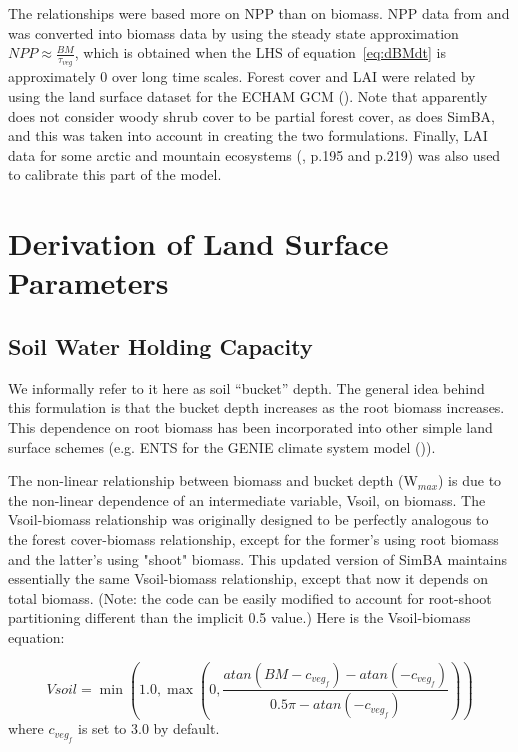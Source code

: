 The relationships were based more on NPP than on biomass.  NPP data from \cite{mcguire1992} and \cite{cramer1999} was converted into biomass data by using the steady state approximation $NPP \approx \frac{BM}{\tau_{veg}}$, which is obtained when the LHS of equation~\eqref{eq:dBMdt} is approximately 0 over long time scales.
Forest cover and LAI were related by using the land surface dataset for the ECHAM GCM (\cite{hagemann2002}).  Note that  \cite{hagemann2002} apparently does not consider woody shrub cover to be partial forest cover, as does SimBA, and this was taken into account in creating the two formulations.
Finally, LAI data for some arctic and mountain ecosystems (\cite{bliss1981}, p.195 and p.219) was also used to calibrate this part of the model.

\section{Derivation of Land Surface Parameters}

\subsection{Soil Water Holding Capacity} We informally refer to it here as soil ``bucket'' depth.  The general idea behind this formulation is that the bucket depth increases as the root biomass increases.  This dependence on root biomass has been incorporated into other simple land surface schemes (e.g. ENTS for the GENIE climate system model (\cite{williamson2006})).

The non-linear relationship between biomass and bucket depth (W$_{max}$) is due to the non-linear dependence of an intermediate variable, Vsoil, on biomass.  The Vsoil-biomass relationship was originally designed to be perfectly analogous  to the forest cover-biomass relationship, except for the former's using root biomass and the latter's using "shoot" biomass.  This updated version of SimBA maintains essentially the same Vsoil-biomass relationship, except that now it depends on total biomass.  (Note: the code can be easily modified to account for root-shoot partitioning different than the implicit 0.5 value.)  Here is the Vsoil-biomass equation:

\begin{equation}
Vsoil = \min(1.0,\max(0,\frac{atan(BM - c_{{veg}_f}) - atan(-c_{{veg}_f})}{0.5\pi - atan(-c_{{veg}_f})}))
\end{equation}
where $c_{{veg_f}}$ is set to 3.0 by default.

